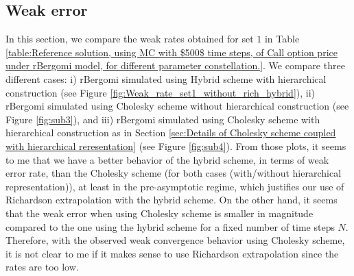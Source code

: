\documentclass[11pt]{article}
\begin{document}
\subsection{Weak error}
In this section, we compare the weak rates obtained for set $1$ in Table
\ref{table:Reference solution, using MC with $500$ time steps, of Call option price under rBergomi model, for different parameter constellation.}. We compare three different cases: i) rBergomi simulated using Hybrid scheme with hierarchical construction (see Figure \ref{fig:Weak_rate_set1_without_rich_hybrid}), ii) rBergomi simulated using Cholesky scheme without hierarchical construction (see Figure \ref{fig:sub3}), and iii) rBergomi simulated using Cholesky scheme with hierarchical construction as in Section \ref{sec:Details of Cholesky scheme coupled with hierarchical reresentation} (see Figure \ref{fig:sub4}). From those plots, it seems to me that we have a better behavior of the hybrid scheme, in terms of weak error rate, than the Cholesky scheme (for both cases (with/without hierarchical representation)), at least in the pre-asymptotic regime, which justifies our use of Richardson extrapolation with the hybrid scheme. On the other hand, it seems that the weak error when using Cholesky scheme is smaller in magnitude compared to the one using the hybrid scheme for a fixed number of time steps $N$. Therefore, with the observed weak convergence behavior using Cholesky scheme, it is not clear to me if it makes sense to use Richardson extrapolation since the rates are too low.
\end{document}

